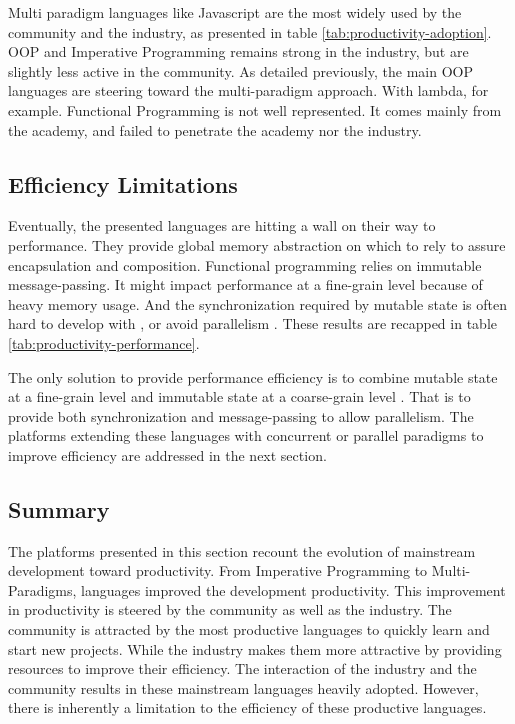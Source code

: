 \separator

Multi paradigm languages like Javascript are the most widely used by the community and the industry, as presented in table \ref{tab:productivity-adoption}.
OOP and Imperative Programming remains strong in the industry, but are slightly less active in the community.
As detailed previously, the main OOP languages are steering toward the multi-paradigm approach.
With lambda, for example.
Functional Programming is not well represented.
It comes mainly from the academy, and failed to penetrate the academy nor the industry.


\subsection{Efficiency Limitations} \label{chapter3:software-productivity:efficiency-limitations}

Eventually, the presented languages are hitting a wall on their way to performance.
They provide global memory abstraction on which to rely to assure encapsulation and composition. %
Functional programming relies on immutable message-passing.
It might impact performance at a fine-grain level because of heavy memory usage.
And the synchronization required by mutable state is often hard to develop with \cite{Adya2002}, or avoid parallelism \cite{Pai1999,Krohn2007}.
These results are recapped in table \ref{tab:productivity-performance}.


The only solution to provide performance efficiency is to combine mutable state at a fine-grain level and immutable state at a coarse-grain level .
That is to provide both synchronization and message-passing to allow parallelism.
The platforms extending these languages with concurrent or parallel paradigms to improve efficiency are addressed in the next section.

\subsection{Summary} \label{chapter3:software-productivity:summary}

The platforms presented in this section recount the evolution of mainstream development toward productivity.
From Imperative Programming to Multi-Paradigms, languages improved the development productivity.
This improvement in productivity is steered by the community as well as the industry.
The community is attracted by the most productive languages to quickly learn and start new projects.
While the industry makes them more attractive by providing resources to improve their efficiency.
The interaction of the industry and the community results in these mainstream languages heavily adopted.
However, there is inherently a limitation to the efficiency of these productive languages.

